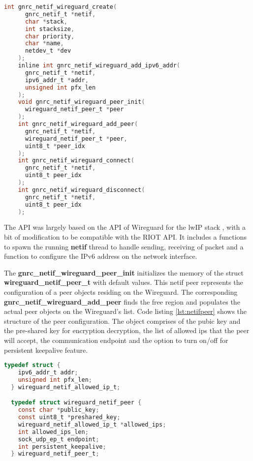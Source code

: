   \begin{lstlisting}[caption = Wireguard netif API,language=C, label={lst:netifapi}]
    int gnrc_netif_wireguard_create(
      gnrc_netif_t *netif, 
      char *stack, 
      int stacksize,
      char priority, 
      char *name,
      netdev_t *dev
    );
    inline int gnrc_netif_wireguard_add_ipv6_addr(
      gnrc_netif_t *netif,
      ipv6_addr_t *addr,
      unsigned int pfx_len
    );
    void gnrc_netif_wireguard_peer_init(
      wireguard_netif_peer_t *peer
    );
    int gnrc_netif_wireguard_add_peer(
      gnrc_netif_t *netif,
      wireguard_netif_peer_t *peer,
      uint8_t *peer_idx
    );
    int gnrc_netif_wireguard_connect(
      gnrc_netif_t *netif, 
      uint8_t peer_idx
    );
    int gnrc_netif_wireguard_disconnect(
      gnrc_netif_t *netif, 
      uint8_t peer_idx
    );
  \end{lstlisting}

  The API was largely based on the API of Wireguard for the lwIP stack \cite{lwip}, with
  a bit of modification to be compatible with the RIOT API. It includes a functions to 
  spawn the running \textbf{netif} thread to handle sending, receiving 
  of packet and a function to configure the IPv6 address on the network interface. 

  The \textbf{gnrc{\_}netif{\_}wireguard{\_}peer{\_}init} initializes the  memory of the struct
  \textbf{wireguard{\_}netif{\_}peer{\_}t} with default values. This netif peer represents
  the configuration of a peer objects residing on the Wireguard. The corresponding
  \textbf{gnrc{\_}netif{\_}wireguard{\_}add{\_}peer} finds the free region and populates 
  the actual peer objects on the Wireguard's list. Code listing \ref{lst:netifpeer} shows
  the structure of the peer configuration. The object comprises of the pubic key and 
  the pre-shared key for encryption decryption, the list of allowed ips that the peer will
  accept, the communication endpoint and the option to turn on/off for persistent keepalive
  feature.

  \begin{lstlisting}[caption = netif peer configuration,language=C, label={lst:netifpeer}]
  typedef struct {
    ipv6_addr_t addr;
    unsigned int pfx_len;
  } wireguard_netif_allowed_ip_t;

  typedef struct wireguard_netif_peer {
    const char *public_key;
    const uint8_t *preshared_key;
    wireguard_netif_allowed_ip_t *allowed_ips;
    int allowed_ips_len;
    sock_udp_ep_t endpoint;
    int persistent_keepalive;
  } wireguard_netif_peer_t;
  \end{lstlisting}

